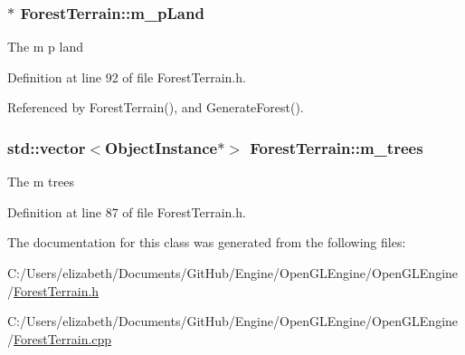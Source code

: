 \subsubsection[{\texorpdfstring{m\+\_\+p\+Land}{m_pLand}}]{$\ast$ Forest\+Terrain\+::m\+\_\+p\+Land\hspace{0.3cm}{\ttfamily [private]}}\hypertarget{class_forest_terrain_a6ef2f670fa4b4e1a9500a87c927d2a5c}{}\label{class_forest_terrain_a6ef2f670fa4b4e1a9500a87c927d2a5c}


The m p land 



Definition at line 92 of file Forest\+Terrain.\+h.



Referenced by Forest\+Terrain(), and Generate\+Forest().

\subsubsection[{\texorpdfstring{m\+\_\+trees}{m_trees}}]{\setlength{\rightskip}{0pt plus 5cm}std\+::vector$<${\bf Object\+Instance}$\ast$$>$ Forest\+Terrain\+::m\+\_\+trees\hspace{0.3cm}{\ttfamily [private]}}\hypertarget{class_forest_terrain_a4e5d3e48f4b6169c7feda855d3b104b2}{}\label{class_forest_terrain_a4e5d3e48f4b6169c7feda855d3b104b2}


The m trees 



Definition at line 87 of file Forest\+Terrain.\+h.



The documentation for this class was generated from the following files\+:\begin{DoxyCompactItemize}
\item 
C\+:/\+Users/elizabeth/\+Documents/\+Git\+Hub/\+Engine/\+Open\+G\+L\+Engine/\+Open\+G\+L\+Engine/\hyperlink{_forest_terrain_8h}{Forest\+Terrain.\+h}\item 
C\+:/\+Users/elizabeth/\+Documents/\+Git\+Hub/\+Engine/\+Open\+G\+L\+Engine/\+Open\+G\+L\+Engine/\hyperlink{_forest_terrain_8cpp}{Forest\+Terrain.\+cpp}\end{DoxyCompactItemize}
